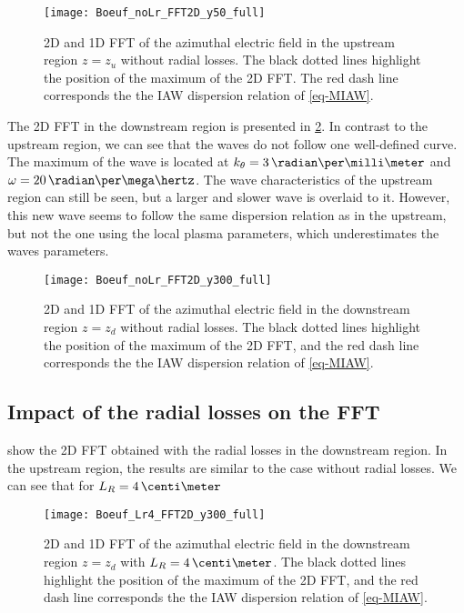 \begin{figure}[hbtp]
  \centering
  \texttt{[image: Boeuf\_noLr\_FFT2D\_y50\_full]}
  \caption{\ac{2D} and \ac{1D} \ac{FFT} of the azimuthal electric field in the upstream region $z=z_u$ without radial losses. The black dotted lines highlight the position of the maximum of the \ac{2D} \ac{FFT}. The red dash line corresponds the the \ac{IAW} dispersion relation of \cref{eq-MIAW}.}
  \label{fig-fft2D_noLr_zu}
\end{figure}

The \ac{2D} \ac{FFT} in the downstream region is presented in \cref{fig-fft2D_noLr_zd}.
In contrast to the upstream region, we can see that the waves do not follow one well-defined curve.
The maximum of the wave is located at $k_{\theta} = 3\,\radian\per\milli\meter$ and $\omega = 20\, \radian\per\mega\hertz$.
The wave characteristics of the upstream region can still be seen, but a larger and slower wave is overlaid to it.
However, this new wave seems to follow the same dispersion relation as in the upstream, but not the one using the local plasma parameters, which underestimates the waves parameters.


\begin{figure}[hbtp]
  \centering
  \texttt{[image: Boeuf\_noLr\_FFT2D\_y300\_full]}
  \caption{\ac{2D} and \ac{1D} \ac{FFT} of the azimuthal electric field in the downstream region $z=z_d$ without radial losses.  The black dotted lines highlight the position of the maximum of the \ac{2D} \ac{FFT}, and the red dash line corresponds the the \ac{IAW} dispersion relation of \cref{eq-MIAW}.}
  \label{fig-fft2D_noLr_zd}
\end{figure}

\subsection{Impact of the radial losses on the \ac{FFT}} \label{subsec-fft_losses}

 show the \ac{2D} \ac{FFT} obtained with the radial losses in the downstream region.
In the upstream region, the results are similar to the case without radial losses.
We can see that for $L_R=4\,\centi\meter$


\begin{figure}[hbtp]
  \centering
  \texttt{[image: Boeuf\_Lr4\_FFT2D\_y300\_full]}
  \caption{\ac{2D} and \ac{1D} \ac{FFT} of the azimuthal electric field in the downstream region $z=z_d$ with $L_R=4\,\centi\meter$.  The black dotted lines highlight the position of the maximum of the \ac{2D} \ac{FFT}, and the red dash line corresponds the the \ac{IAW} dispersion relation of \cref{eq-MIAW}.}
  \label{fig-fft2D_Lr4_zd}
\end{figure}


